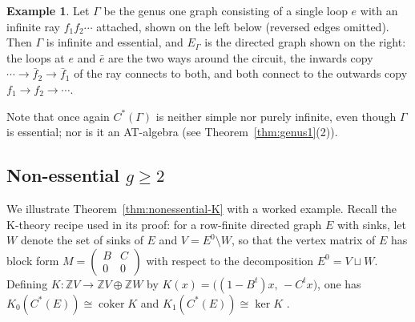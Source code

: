 \documentclass[12pt,reqno]{amsart}
\theoremstyle{plain}
\theoremstyle{definition}
\newtheorem{example}[theorem]{Example}
\newcommand{\Z}{\mathbb{Z}}
\newcommand{\coker}{\operatorname{coker}}
\begin{document}
\begin{example}\label{ex:genus-one-infinite}
Let $\Gamma$ be the genus one graph consisting of a single loop $e$ with an infinite ray $f_1f_2\cdots$
attached, shown on the left below (reversed edges omitted). Then $\Gamma$ is infinite and essential,
and $E_\Gamma$ is the directed graph shown on the right: the loops at $e$ and
$\bar e$ are the two ways around the circuit, the inwards copy
$\cdots\to\bar f_2\to\bar f_1$ of the ray connects to both, and both connect to the outwards copy
$f_1\to f_2\to\cdots$.
\begin{center}
\end{center}
Note that once again $C^*(\Gamma)$ is neither simple nor purely infinite, even though $\Gamma$ is
essential; nor is it an AT-algebra \textup(see Theorem~\ref{thm:genus1}(2)\textup).
\end{example}


\subsection*{Non-essential $g\ge 2$} We illustrate Theorem~\ref{thm:nonessential-K} with a worked
example. Recall the K-theory recipe used in its proof: for a
row-finite directed graph $E$ with sinks, let $W$ denote the set of sinks of $E$ and
$V=E^0\setminus W$, so that the vertex matrix of $E$ has block form
$M=\left(\begin{smallmatrix} B & C\\ 0 & 0\end{smallmatrix}\right)$ with respect to the decomposition
$E^0=V\sqcup W$. Defining $K\colon\Z V\to\Z V\oplus\Z W$ by $K(x)=\big((1-B^{t})x,\,-C^{t}x\big)$,
one has $K_0(C^*(E))\cong\coker K$ and $K_1(C^*(E))\cong\ker K$ \cite[Theorem~3.2]{RS}.
\end{document}
